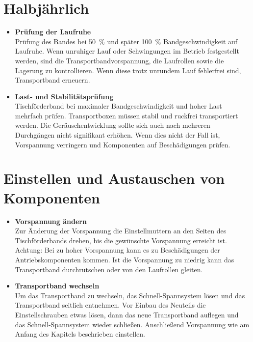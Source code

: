 \section{Halbjährlich}

\begin{itemize}
	
	\item \textbf{Prüfung der Laufruhe} \\
	Prüfung des Bandes bei 50 \% und später 100 \% Bandgeschwindigkeit auf Laufruhe. Wenn unruhiger Lauf oder Schwingungen im Betrieb festgestellt werden, sind die Transportbandvorspannung, die Laufrollen sowie die Lagerung zu kontrollieren. Wenn diese trotz unrundem Lauf fehlerfrei sind, Transportband erneuern.
	
	\item \textbf{Last- und Stabilitätsprüfung} \\
	Tischförderband bei maximaler Bandgeschwindigkeit und hoher Last mehrfach prüfen. Transportboxen müssen stabil und ruckfrei transportiert werden. Die Geräuschentwicklung sollte sich auch nach mehreren Durchgängen nicht signifikant erhöhen. Wenn dies nicht der Fall ist, Vorspannung verringern und Komponenten auf Beschädigungen prüfen.
	
\end{itemize}

\section{Einstellen und Austauschen von Komponenten} 
\label{sec:einstellen}

\begin{itemize}
	
	\item \textbf{Vorspannung ändern} \\
	Zur Änderung der Vorspannung die Einstellmuttern an den Seiten des Tischförderbands drehen, bis die gewünschte Vorspannung erreicht ist. Achtung: Bei zu hoher Vorspannung kann es zu Beschädigungen der Antriebskomponenten kommen. Ist die Vorspannung zu niedrig kann das Transportband durchrutschen oder von den Laufrollen gleiten.
	
	\item \textbf{Transportband wechseln} \\
	Um das Transportband zu wechseln, das Schnell-Spannsystem lösen und das Transportband seitlich entnehmen. Vor Einbau des Neuteils die Einstellschrauben etwas lösen, dann das neue Transportband auflegen und das Schnell-Spannsystem wieder schließen. Anschließend Vorspannung wie am Anfang des Kapitels beschrieben einstellen.
	
\end{itemize}
